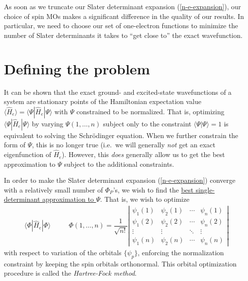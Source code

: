 \documentclass[11pt]{article}
\newcommand{\F}{\ensuremath{\Phi}}
\newcommand{\y}{\ensuremath{\psi}}
\newcommand{\Y}{\ensuremath{\Psi}}
\newcommand{\op}[1]{\ensuremath{ \hat{#1} } }
\newcommand{\ld}{\ensuremath{\ldots}}
\newcommand{\cd}{\ensuremath{\cdots}}
\newcommand{\vd}{\ensuremath{\vdots}}
\newcommand{\dd}{\ensuremath{\ddots}}
\renewcommand{\sp}{\ensuremath{\ \ \ \ \ \ }}
\newcommand{\fr}[2]{\ensuremath{ \dfrac{#1}{#2} }}
\newcommand{\ip}[1]{\ensuremath{\langle #1\rangle}}
\newcommand{\ar}[1]{\ensuremath{\begin{matrix} #1 \end{matrix}}}
\theoremstyle{indented}
\begin{document}
As soon as we truncate our Slater determinant expansion (\ref{n-e-expansion}), our choice of spin MOs makes a significant difference in the quality of our results.
In particular, we need to choose our set of one-electron functions to minimize the number of Slater determinants it takes to ``get close to'' the exact wavefunction.


\section*{Defining the problem}
It can be shown that the exact ground- and excited-state wavefunctions of a system are stationary points of the Hamiltonian expectation value $\ip{\op{H}_e}=\ip{\Y|\op{H}_e|\Y}$ with $\Y$ constrained to be normalized.
That is, optimizing $\ip{\Y|\op{H}_e|\Y}$ by varying $\Y(1,\ld,n)$ subject only to the constraint $\ip{\Y|\Y}=1$ is equivalent to solving the Schr\"odinger equation.
When we further constrain the form of $\Y$, this is no longer true (i.e.\ we will generally {\it not} get an exact eigenfunction of $\op{H}_e$).
However, this {\it does} generally allow us to get the best approximation to $\Y$ subject to the additional constraints.

In order to make the Slater determinant expansion (\ref{n-e-expansion}) converge with a relatively small number of $\F_P$'s, we wish to find the \ul{best single-determinant approximation to $\Y$}.
That is, we wish to optimize
\begin{align}
	\ip{\F|\op{H}_e|\F}
\sp\sp
	\F(1,\ld,n)
=
\fr{1}{\sqrt{n!}}
\left|\ar{
	\y_1(1)&\y_2(1)&\cd&\y_n(1)\\
	\y_1(2)&\y_2(2)&\cd&\y_n(2)\\
	\vd    &\vd    &\dd&\vd    \\
	\y_1(n)&\y_2(n)&\cd&\y_n(n)}\right|
\end{align}
with respect to variation of the orbitals $\{\y_p\}$, enforcing the normalization constraint by keeping the spin orbitals orthonormal.
This orbital optimization procedure is called the {\it Hartree-Fock method}.
\end{document}

